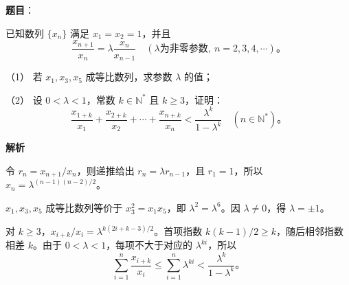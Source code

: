 \begin{answer}

\textbf{题目}：

已知数列 $\{x_n\}$ 满足 $x_1=x_2=1$，并且
\nopagebreak[4]
\[
\frac{x_{n+1}}{x_n}=\lambda\frac{x_n}{x_{n-1}}\quad(\lambda\text{为非零参数},\ n=2,3,4,\cdots)。
\]

（1） 若 $x_1,x_3,x_5$ 成等比数列，求参数 $\lambda$ 的值；

（2） 设 $0<\lambda<1$，常数 $k\in\mathbb N^*$ 且 $k\ge3$，证明：
\nopagebreak[4]
\[
\frac{x_{1+k}}{x_1}+\frac{x_{2+k}}{x_2}+\cdots+\frac{x_{n+k}}{x_n}<\frac{\lambda^k}{1-\lambda^k}\quad(n\in\mathbb N^*)。
\]

\textbf{解析}

令 $r_n=x_{n+1}/x_n$，则递推给出 $r_n=\lambda r_{n-1}$，且 $r_1=1$，所以 $x_n=\lambda^{(n-1)(n-2)/2}$。


$x_1,x_3,x_5$ 成等比数列等价于 $x_3^2=x_1x_5$，即 $\lambda^2=\lambda^6$。因 $\lambda\ne0$，得 $\lambda=\pm1$。


对 $k\ge3$，$x_{i+k}/x_i=\lambda^{k(2i+k-3)/2}$。首项指数 $k(k-1)/2\ge k$，随后相邻指数相差 $k$。由于 $0<\lambda<1$，每项不大于对应的 $\lambda^{ki}$，所以
\nopagebreak[4]
\[
\sum_{i=1}^{n}\frac{x_{i+k}}{x_i}\le\sum_{i=1}^{n}\lambda^{ki}<\frac{\lambda^k}{1-\lambda^k}。
\]



\end{answer}
